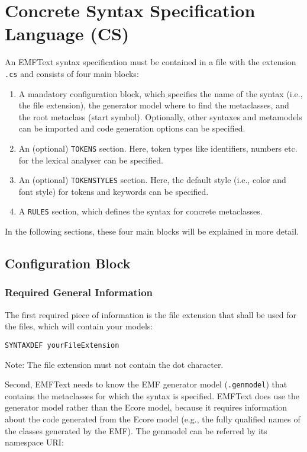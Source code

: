 \chapter{Concrete Syntax Specification Language (CS)}
\label{chap:cs}

An EMFText syntax specification must be contained in a file with the 
extension \texttt{.cs} and consists of four main blocks:

\begin{enumerate}
  \item A mandatory configuration block, which specifies the name of the syntax
        (i.e., the file extension), the generator model where to find the
        metaclasses, and the root metaclass (start symbol). Optionally, other
        syntaxes and metamodels can be imported and code generation options can
        be specified.
  \item An (optional) \texttt{TOKENS} section. Here, token types like identifiers, numbers etc.
  		 for the lexical analyser can be specified.
  \item An (optional) \texttt{TOKENSTYLES} section. Here, the default style
        (i.e., color and font style) for tokens and keywords can be specified.
  \item A \texttt{RULES} section, which defines the syntax for concrete
        metaclasses.
\end{enumerate}

In the following sections, these four main blocks will be explained in more
detail.

\section{Configuration Block}

\subsection{Required General Information}

The first required piece of information is the file extension that shall
be used for the files, which will contain your models:

\begin{lstlisting}
SYNTAXDEF yourFileExtension
\end{lstlisting}

Note: The file extension must not contain the dot character.

Second, EMFText needs to know the EMF generator model (\texttt{.genmodel}) that
contains the metaclasses for which the syntax is specified. EMFText does use
the generator model rather than the Ecore model, because it requires
information about the code generated from the Ecore model (e.g., the fully
qualified names of the classes generated by the EMF). The genmodel can be referred 
by its namespace URI: 

